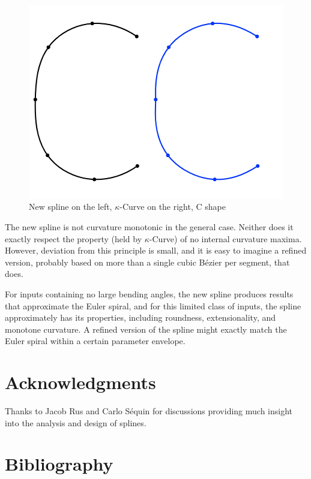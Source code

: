 \documentclass{article}
\newcommand{\kcurve}{$\kappa$-Curve}
\begin{document}
\begin{figure}
\centering
\includegraphics[scale=0.5]{biparab_mine_c}
\caption{New spline on the left{}, \kcurve{} on the right, C shape}
\label{cshape}
\end{figure}

The new spline is not curvature monotonic in the general case. Neither does it exactly respect the property (held by \kcurve) of no internal curvature maxima. However, deviation from this principle is small, and it is easy to imagine a refined version, probably based on more than a single cubic B{\'e}zier per segment, that does.

For inputs containing no large bending angles, the new spline produces results that approximate the Euler spiral, and for this limited class of inputs, the spline approximately has its properties, including roundness, extensionality, and monotone curvature. A refined version of the spline might exactly match the Euler spiral within a certain parameter envelope.

\section{Acknowledgments}

Thanks to Jacob Rus and Carlo S{\'e}quin for discussions providing much insight into the analysis and design of splines.

\section{Bibliography}

{}

\end{document}
